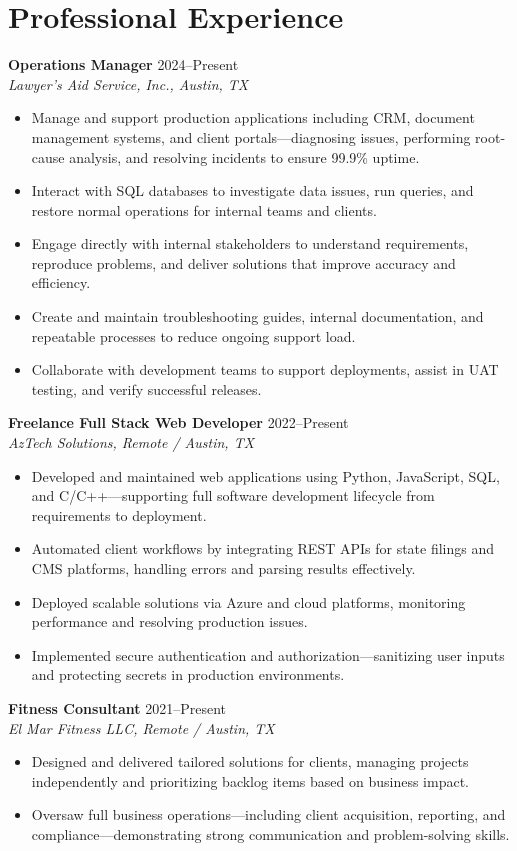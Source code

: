 \documentclass[letterpaper,10pt]{article}
\newcommand{\resumeItem}[1]{\item[] \small{#1}}
\begin{document}
\section*{Professional Experience}
\begin{compactitem}
  \item[]
    \textbf{Operations Manager} \hfill 2024--Present \\
    \textit{Lawyer's Aid Service, Inc., Austin, TX}
  \begin{itemize}
    \resumeItem{Manage and support production applications including CRM, document management systems, and client portals---diagnosing issues, performing root-cause analysis, and resolving incidents to ensure 99.9\% uptime.}
    \resumeItem{Interact with SQL databases to investigate data issues, run queries, and restore normal operations for internal teams and clients.}
    \resumeItem{Engage directly with internal stakeholders to understand requirements, reproduce problems, and deliver solutions that improve accuracy and efficiency.}
    \resumeItem{Create and maintain troubleshooting guides, internal documentation, and repeatable processes to reduce ongoing support load.}
    \resumeItem{Collaborate with development teams to support deployments, assist in UAT testing, and verify successful releases.}
  \end{itemize}

  \item[]
    \textbf{Freelance Full Stack Web Developer} \hfill 2022--Present \\
    \textit{AzTech Solutions, Remote / Austin, TX}
  \begin{itemize}
    \resumeItem{Developed and maintained web applications using Python, JavaScript, SQL, and C/C++---supporting full software development lifecycle from requirements to deployment.}
    \resumeItem{Automated client workflows by integrating REST APIs for state filings and CMS platforms, handling errors and parsing results effectively.}
    \resumeItem{Deployed scalable solutions via Azure and cloud platforms, monitoring performance and resolving production issues.}
    \resumeItem{Implemented secure authentication and authorization---sanitizing user inputs and protecting secrets in production environments.}
  \end{itemize}

  \item[]
    \textbf{Fitness Consultant} \hfill 2021--Present \\
    \textit{El Mar Fitness LLC, Remote / Austin, TX}
  \begin{itemize}
    \resumeItem{Designed and delivered tailored solutions for clients, managing projects independently and prioritizing backlog items based on business impact.}
    \resumeItem{Oversaw full business operations---including client acquisition, reporting, and compliance---demonstrating strong communication and problem-solving skills.}
  \end{itemize}
\end{compactitem}
\end{document}
